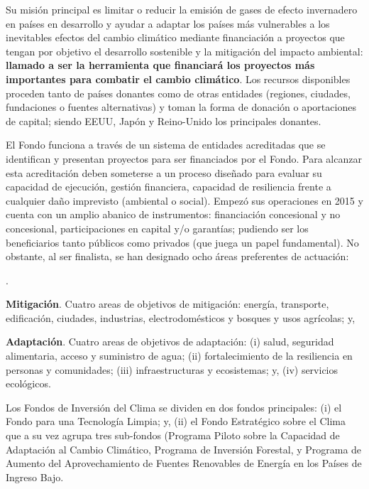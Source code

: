 \documentclass[10pt,a4paper]{article}
\newcounter{numitem}
\newenvironment{lnum}
      {\begin{list}{\arabic{numitem}.}{%
          \usecounter{numitem}%
          \setlength{\leftmargin}{1cm}%
          \setlength{\parskip}{3pt}%
          \setlength{\itemsep}{0pt}%
          \setlength{\parsep}{0pt}%
      }}
      {\end{list}}
\begin{document}
Su misión principal es limitar o reducir la emisión de gases de efecto invernadero en países en desarrollo y ayudar a adaptar los países más vulnerables a los inevitables efectos del cambio climático mediante financiación a proyectos que tengan por objetivo el desarrollo sostenible y la mitigación del impacto ambiental: \textbf{llamado a ser la herramienta que financiará los proyectos más importantes para combatir el cambio climático}. Los recursos disponibles proceden tanto de países donantes como de otras entidades (regiones, ciudades, fundaciones o fuentes alternativas) y toman la forma de donación o aportaciones de capital; siendo EEUU, Japón y Reino-Unido los principales donantes.

El Fondo funciona a través de un sistema de entidades acreditadas que se identifican y presentan proyectos para ser financiados por el Fondo. Para alcanzar esta acreditación deben someterse a un proceso diseñado para evaluar su capacidad de ejecución, gestión financiera, capacidad de resiliencia frente a cualquier daño imprevisto (ambiental o social). Empezó sus operaciones en 2015 y cuenta con un amplio abanico de instrumentos: financiación concesional y no concesional, participaciones en capital y/o garantías; pudiendo ser los beneficiarios tanto públicos como privados (que juega un papel fundamental). No obstante, al ser finalista, se han designado ocho áreas preferentes de actuación:
\begin{lnum}
    \item \textbf{Mitigación}. Cuatro areas de objetivos de mitigación: energía, transporte, edificación, ciudades, industrias, electrodomésticos y bosques y usos agrícolas; y,
    \item \textbf{Adaptación}. Cuatro areas de objetivos de adaptación: (i) salud, seguridad alimentaria, acceso y suministro de agua; (ii) fortalecimiento de la resiliencia en personas y comunidades; (iii) infraestructuras y ecosistemas; y, (iv) servicios ecológicos. 
\end{lnum}

Los Fondos de Inversión del Clima se dividen en dos fondos principales: (i) el Fondo para una Tecnología Limpia; y, (ii) el Fondo Estratégico sobre el Clima que a su vez agrupa tres sub-fondos (Programa Piloto sobre la Capacidad de Adaptación al Cambio Climático,  Programa de Inversión Forestal, y Programa de Aumento del Aprovechamiento de Fuentes Renovables de Energía en los Países de Ingreso Bajo.



\clearpage
\end{document}
